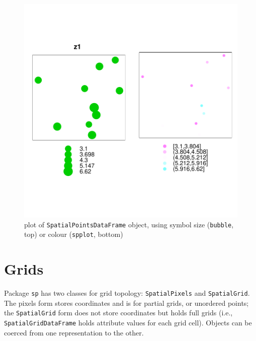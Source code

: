 \documentclass{article}
\begin{document}
\begin{figure}
\begin{center}
\includegraphics{sp-014}
\end{center}
\caption{plot of {\tt SpatialPointsDataFrame} object, using symbol 
size ({\tt bubble}, top) or colour ({\tt spplot}, bottom) }
\label{fig:spdf}
\end{figure}

\section{Grids}
Package {\tt sp} has two classes for grid topology: {\tt SpatialPixels}
and {\tt SpatialGrid}. The pixels form stores coordinates and is for
partial grids, or unordered points; the {\tt SpatialGrid} form does not
store coordinates but holds full grids (i.e., {\tt SpatialGridDataFrame}
holds attribute values for each grid cell). Objects can be coerced from
one representation to the other.
\end{document}
